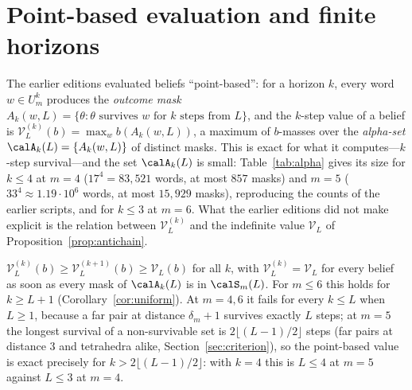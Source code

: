 \section{Point-based evaluation and finite horizons}\label{sec:pbvi}

The earlier editions evaluated beliefs ``point-based'': for a horizon $k$, every word $w\in U_m^k$ produces the \emph{outcome mask} $A_k(w,L)=\{\theta:\theta\text{ survives }w\text{ for }k\text{ steps from }L\}$, and the $k$-step value of a belief is $\mathcal V^{(k)}_L(b)=\max_w b(A_k(w,L))$, a maximum of $b$-masses over the \emph{alpha-set} $\calA_k(L)=\{A_k(w,L)\}$ of distinct masks. This is exact for what it computes---$k$-step survival---and the set $\calA_k(L)$ is small: Table~\ref{tab:alpha} gives its size for $k\le4$ at $m=4$ ($17^4=83{,}521$ words, at most $857$ masks) and $m=5$ ($33^4\approx1.19\cdot10^6$ words, at most $15{,}929$ masks), reproducing the counts of the earlier scripts, and for $k\le3$ at $m=6$. What the earlier editions did not make explicit is the relation between $\mathcal V^{(k)}_L$ and the indefinite value $\mathcal V_L$ of Proposition~\ref{prop:antichain}.

\begin{proposition}\label{prop:pbvi}
$\mathcal V^{(k)}_L(b)\ge\mathcal V^{(k+1)}_L(b)\ge\mathcal V_L(b)$ for all $k$, with $\mathcal V^{(k)}_L=\mathcal V_L$ for every belief as soon as every mask of $\calA_k(L)$ is in $\calS_m(L)$. For $m\le6$ this holds for $k\ge L+1$ (Corollary~\ref{cor:uniform}). At $m=4,6$ it fails for every $k\le L$ when $L\ge1$, because a far pair at distance $\delta_m+1$ survives exactly $L$ steps; at $m=5$ the longest survival of a non-survivable set is $2\lfloor(L-1)/2\rfloor$ steps (far pairs at distance $3$ and tetrahedra alike, Section~\ref{sec:criterion}), so the point-based value is exact precisely for $k>2\lfloor(L-1)/2\rfloor$: with $k=4$ this is $L\le4$ at $m=5$ against $L\le3$ at $m=4$.
\end{proposition}

